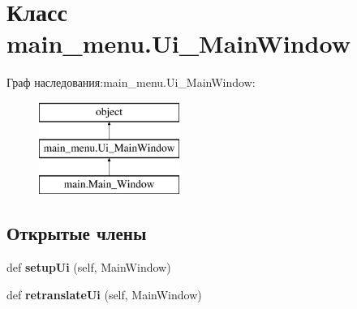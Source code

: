 \hypertarget{classmain__menu_1_1_ui___main_window}{}\section{Класс main\+\_\+menu.\+Ui\+\_\+\+Main\+Window}
\label{classmain__menu_1_1_ui___main_window}
Граф наследования\+:main\+\_\+menu.\+Ui\+\_\+\+Main\+Window\+:\begin{figure}[H]
\begin{center}
\leavevmode
\includegraphics[height=3.000000cm]{classmain__menu_1_1_ui___main_window}
\end{center}
\end{figure}
\subsection*{Открытые члены}
\begin{DoxyCompactItemize}
\item 
\mbox{\label{classmain__menu_1_1_ui___main_window_ab775fda9b5e9b5999364c44f335bc148}} 
def {\bfseries setup\+Ui} (self, Main\+Window)
\item 
\mbox{\label{classmain__menu_1_1_ui___main_window_afc5b3b59947cb086923048a8fda86243}} 
def {\bfseries retranslate\+Ui} (self, Main\+Window)
\end{DoxyCompactItemize}
